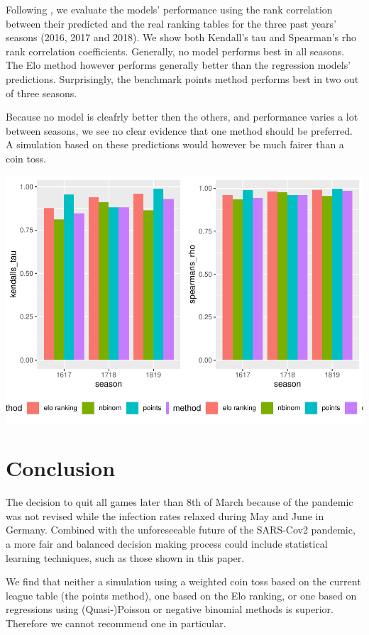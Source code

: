 \documentclass[12pt,a4paper]{article}
\begin{document}
Following \textcite{leitner2010}, we evaluate the models' performance
using the rank correlation between their predicted and the real ranking
tables for the three past years' seasons (2016, 2017 and 2018). We show
both Kendall's tau and Spearman's rho rank correlation coefficients.
Generally, no model performs best in all seasons. The Elo method however
performs generally better than the regression models' predictions.
Surprisingly, the benchmark points method performs best in two out of
three seasons.

Because no model is cleafrly better then the others, and performance
varies a lot between seasons, we see no clear evidence that one method
should be preferred. A simulation based on these predictions would
however be much fairer than a coin toss.



\includegraphics{term_paper_eem_files/figure-latex/unnamed-chunk-9-1.pdf}

\hypertarget{conclusion}{%
\section{Conclusion}\label{conclusion}}

The decision to quit all games later than 8th of March because of the
pandemic was not revised while the infection rates relaxed during May
and June in Germany. Combined with the unforeseeable future of the
SARS-Cov2 pandemic, a more fair and balanced decision making process
could include statistical learning techniques, such as those shown in
this paper.

We find that neither a simulation using a weighted coin toss based on
the current league table (the points method), one based on the Elo
ranking, or one based on regressions using (Quasi-)Poisson or negative
binomial methods is superior. Therefore we cannot recommend one in
particular.
\end{document}

